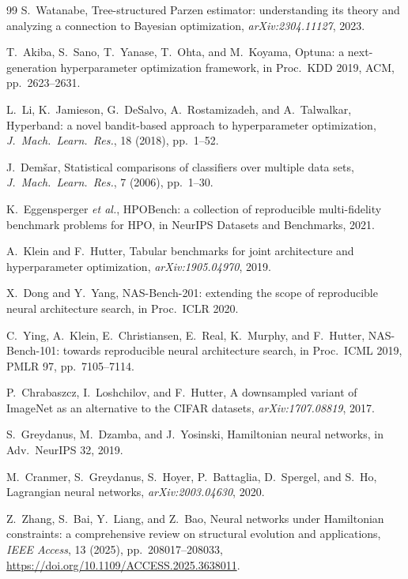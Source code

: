 \documentclass[11pt]{article}
\theoremstyle{definition}
\begin{document}
\begin{thebibliography}{99}
S.~Watanabe,
Tree-structured Parzen estimator: understanding its theory and
analyzing a connection to Bayesian optimization,
\textit{arXiv:2304.11127}, 2023.

T.~Akiba, S.~Sano, T.~Yanase, T.~Ohta, and M.~Koyama,
Optuna: a next-generation hyperparameter optimization framework,
in Proc.\ KDD 2019, ACM, pp.~2623--2631.

L.~Li, K.~Jamieson, G.~DeSalvo, A.~Rostamizadeh, and A.~Talwalkar,
Hyperband: a novel bandit-based approach to hyperparameter optimization,
\textit{J.\ Mach.\ Learn.\ Res.}, 18 (2018), pp.~1--52.

J.~Dem\v{s}ar,
Statistical comparisons of classifiers over multiple data sets,
\textit{J.\ Mach.\ Learn.\ Res.}, 7 (2006), pp.~1--30.

K.~Eggensperger \textit{et al.},
HPOBench: a collection of reproducible multi-fidelity benchmark
problems for HPO,
in NeurIPS Datasets and Benchmarks, 2021.

A.~Klein and F.~Hutter,
Tabular benchmarks for joint architecture and hyperparameter
optimization,
\textit{arXiv:1905.04970}, 2019.

X.~Dong and Y.~Yang,
NAS-Bench-201: extending the scope of reproducible neural architecture
search,
in Proc.\ ICLR 2020.

C.~Ying, A.~Klein, E.~Christiansen, E.~Real, K.~Murphy, and F.~Hutter,
NAS-Bench-101: towards reproducible neural architecture search,
in Proc.\ ICML 2019, PMLR 97, pp.~7105--7114.

P.~Chrabaszcz, I.~Loshchilov, and F.~Hutter,
A downsampled variant of ImageNet as an alternative to the CIFAR
datasets,
\textit{arXiv:1707.08819}, 2017.

S.~Greydanus, M.~Dzamba, and J.~Yosinski,
Hamiltonian neural networks,
in Adv.\ NeurIPS 32, 2019.

M.~Cranmer, S.~Greydanus, S.~Hoyer, P.~Battaglia, D.~Spergel, and S.~Ho,
Lagrangian neural networks,
\textit{arXiv:2003.04630}, 2020.

Z.~Zhang, S.~Bai, Y.~Liang, and Z.~Bao,
Neural networks under Hamiltonian constraints: a comprehensive review
on structural evolution and applications,
\textit{IEEE Access}, 13 (2025), pp.~208017--208033,
\url{https://doi.org/10.1109/ACCESS.2025.3638011}.


\end{thebibliography}
\end{document}
